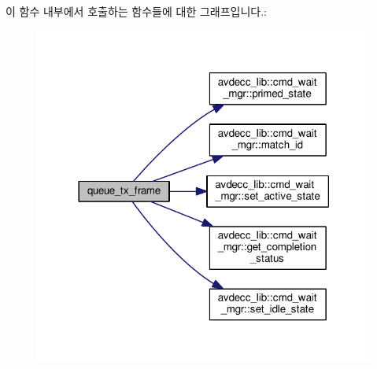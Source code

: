 이 함수 내부에서 호출하는 함수들에 대한 그래프입니다.\+:
\nopagebreak
\begin{figure}[H]
\begin{center}
\leavevmode
\includegraphics[width=318pt]{classavdecc__lib_1_1system__layer2__multithreaded__callback_ae99ddb9003d119d56bd3be4db55f5320_cgraph}
\end{center}
\end{figure}




